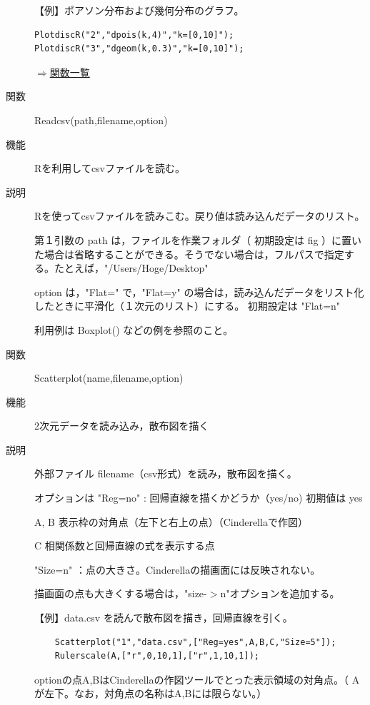 \documentclass[papersize,a4paper,12pt,uplatex]{jsarticle}
\begin{document}
\begin{description}
【例】ポアソン分布および幾何分布のグラフ。
\begin{verbatim}
PlotdiscR("2","dpois(k,4)","k=[0,10]");
PlotdiscR("3","dgeom(k,0.3)","k=[0,10]");
\end{verbatim}
\vspace{\baselineskip}
\begin{flushright}  \hyperlink{functionlist}{$\Rightarrow$関数一覧}\end{flushright}

\hypertarget{readcsv}{}
\item[関数]  Readcsv(path,filename,option)
\item[機能]  Rを利用してcsvファイルを読む。
\item[説明]  Rを使ってcsvファイルを読みこむ。戻り値は読み込んだデータのリスト。

第１引数の path は，ファイルを作業フォルダ（ 初期設定は fig ）に置いた場合は省略することができる。そうでない場合は，フルパスで指定する。たとえば，"/Users/Hoge/Desktop"

option は，"Flat=" で，"Flat=y" の場合は，読み込んだデータをリスト化したときに平滑化（１次元のリスト）にする。 初期設定は "Flat=n"

利用例は Boxplot() などの例を参照のこと。

\vspace{\baselineskip}
\hypertarget{scatterplot}{}
\item[関数]  Scatterplot(name,filename,option)
\item[機能]  2次元データを読み込み，散布図を描く
\item[説明]  外部ファイル filename（csv形式）を読み，散布図を描く。

オプションは  "Reg=no" : 回帰直線を描くかどうか（yes/no) 初期値は yes

                A, B  表示枠の対角点（左下と右上の点）（Cinderellaで作図）
                
                C    相関係数と回帰直線の式を表示する点
                
              "Size=n"  ：点の大きさ。Cinderellaの描画面には反映されない。
              
                      描画面の点も大きくする場合は，"size-$>$n"オプションを追加する。
                      
\vspace{\baselineskip}
【例】data.csv を読んで散布図を描き，回帰直線を引く。
\begin{verbatim}
    Scatterplot("1","data.csv",["Reg=yes",A,B,C,"Size=5"]);
    Rulerscale(A,["r",0,10,1],["r",1,10,1]);
\end{verbatim}
  optionの点A,BはCinderellaの作図ツールでとった表示領域の対角点。（ Aが左下。なお，対角点の名称はA,Bには限らない。）
  

\end{description}
\end{document}
